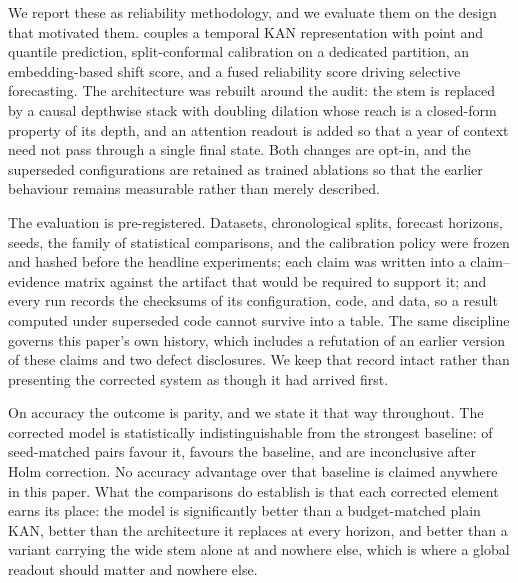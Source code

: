 We report these as reliability methodology, and we evaluate them on the design that motivated them. \method{} couples a temporal KAN representation with point and quantile prediction, split-conformal calibration on a dedicated partition, an embedding-based shift score, and a fused reliability score driving selective forecasting. The architecture was rebuilt around the audit: the stem is replaced by a causal depthwise stack with doubling dilation whose reach is a closed-form property of its depth, and an attention readout is added so that a year of context need not pass through a single final state. Both changes are opt-in, and the superseded configurations are retained as trained ablations so that the earlier behaviour remains measurable rather than merely described.

The evaluation is pre-registered. Datasets, chronological splits, forecast horizons, seeds, the family of statistical comparisons, and the calibration policy were frozen and hashed before the headline experiments; each claim was written into a claim--evidence matrix against the artifact that would be required to support it; and every run records the checksums of its configuration, code, and data, so a result computed under superseded code cannot survive into a table. The same discipline governs this paper's own history, which includes a refutation of an earlier version of these claims and two defect disclosures. We keep that record intact rather than presenting the corrected system as though it had arrived first.

On accuracy the outcome is parity, and we state it that way throughout. The corrected model is statistically indistinguishable from the strongest baseline: \pairedTransformerWins{} of \pairedTransformerTotal{} seed-matched pairs favour it, \pairedTransformerLosses{} favours the baseline, and \pairedTransformerTied{} are inconclusive after Holm correction. No accuracy advantage over that baseline is claimed anywhere in this paper. What the comparisons do establish is that each corrected element earns its place: the model is significantly better than a budget-matched plain KAN, better than the architecture it replaces at every horizon, and better than a variant carrying the wide stem alone at \pairedDilatedWinHorizons{} and nowhere else, which is where a global readout should matter and nowhere else.

